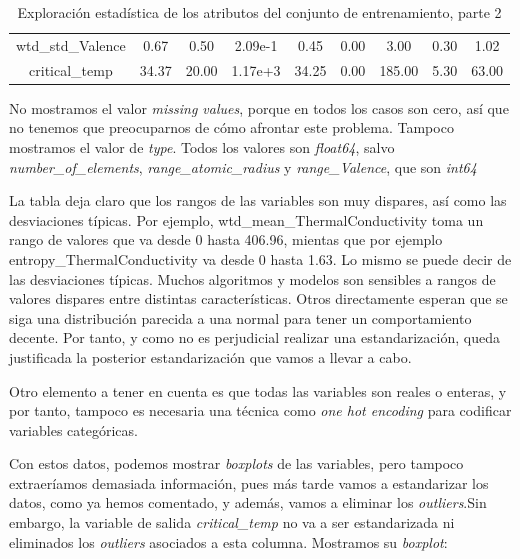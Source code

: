 \documentclass[11pt]{article}
\begin{document}
\begin{table}[H]
{\begin{tabular}{|c|c|c|c|c|c|c|c|c|}
wtd\_std\_Valence                     &    0.67&     0.50&  2.09e-1&     0.45&    0.00&      3.00&     0.30&     1.02 \\
critical\_temp                        &  34.37&    20.00&  1.17e+3&    34.25&    0.00&    185.00&     5.30&    63.00 \\
    \hline
    \end{tabular}
    }
    \caption{Exploración estadística de los atributos del conjunto de entrenamiento, parte 2}
    \label{Tabla con los estadísticos de las features}
\end{table}

No mostramos el valor \emph{missing values}, porque en todos los casos son cero, así que no tenemos que preocuparnos de cómo afrontar este problema. Tampoco mostramos el valor de \emph{type}. Todos los valores son \emph{float64}, salvo \emph{number\_of\_elements}, \emph{range\_atomic\_radius} y \emph{range\_Valence}, que son \emph{int64}

La tabla deja claro que los rangos de las variables son muy dispares, así como las desviaciones típicas. Por ejemplo, wtd\_mean\_ThermalConductivity toma un rango de valores que va desde 0 hasta 406.96, mientas que por ejemplo entropy\_ThermalConductivity va desde 0 hasta 1.63. Lo mismo se puede decir de las desviaciones típicas. Muchos algoritmos y modelos son sensibles a rangos de valores dispares entre distintas características. Otros directamente esperan que se siga una distribución parecida a una normal para tener un comportamiento decente. Por tanto, y como no es perjudicial realizar una estandarización, queda justificada la posterior estandarización que vamos a llevar a cabo.

Otro elemento a tener en cuenta es que todas las variables son reales o enteras, y por tanto, tampoco es necesaria una técnica como \emph{one hot encoding} para codificar variables categóricas.

Con estos datos, podemos mostrar \emph{boxplots} de las variables, pero tampoco extraeríamos demasiada información, pues más tarde vamos a estandarizar los datos, como ya hemos comentado, y además, vamos a eliminar los \emph{outliers}.Sin embargo, la variable de salida \emph{critical\_temp} no va a ser estandarizada ni eliminados los \emph{outliers} asociados a esta columna. Mostramos su \emph{boxplot}:
\end{document}
